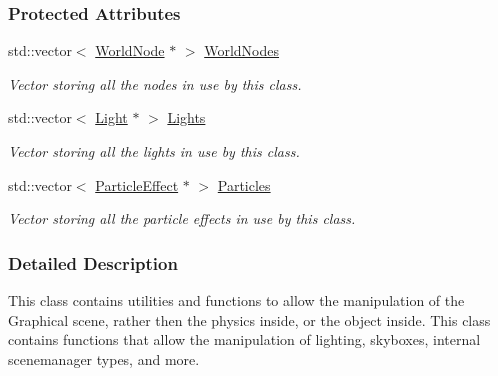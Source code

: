 \subsubsection*{Protected Attributes}
\begin{DoxyCompactItemize}
\item 
\hypertarget{classphys_1_1SceneManager_a51a391281cc074801792599ae38638b0}{
std::vector$<$ \hyperlink{classphys_1_1WorldNode}{WorldNode} $\ast$ $>$ \hyperlink{classphys_1_1SceneManager_a51a391281cc074801792599ae38638b0}{WorldNodes}}
\label{classphys_1_1SceneManager_a51a391281cc074801792599ae38638b0}

\begin{DoxyCompactList}\small\item\em Vector storing all the nodes in use by this class. \item\end{DoxyCompactList}\item 
\hypertarget{classphys_1_1SceneManager_a196c70361e8db0d5861cfb7b35f1bbf3}{
std::vector$<$ \hyperlink{classphys_1_1Light}{Light} $\ast$ $>$ \hyperlink{classphys_1_1SceneManager_a196c70361e8db0d5861cfb7b35f1bbf3}{Lights}}
\label{classphys_1_1SceneManager_a196c70361e8db0d5861cfb7b35f1bbf3}

\begin{DoxyCompactList}\small\item\em Vector storing all the lights in use by this class. \item\end{DoxyCompactList}\item 
\hypertarget{classphys_1_1SceneManager_a45f2d2029642d668c1e15a914eac7d1b}{
std::vector$<$ \hyperlink{classphys_1_1ParticleEffect}{ParticleEffect} $\ast$ $>$ \hyperlink{classphys_1_1SceneManager_a45f2d2029642d668c1e15a914eac7d1b}{Particles}}
\label{classphys_1_1SceneManager_a45f2d2029642d668c1e15a914eac7d1b}

\begin{DoxyCompactList}\small\item\em Vector storing all the particle effects in use by this class. \item\end{DoxyCompactList}\end{DoxyCompactItemize}


\subsubsection{Detailed Description}
This class contains utilities and functions to allow the manipulation of the Graphical scene, rather then the physics inside, or the object inside. This class contains functions that allow the manipulation of lighting, skyboxes, internal scenemanager types, and more. 

